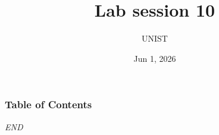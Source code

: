 \documentclass[aspectratio=169,10pt]{beamer}
\title[Introduction to AIP2] %
{Lab session 10}
\author{UNIST}
\institute[UNIST] %
{
  Ulsan National Institute of Science and Technology
}
\date %
{Jun 1, 2026}
\begin{document}
\frame{\titlepage}


\begin{frame}
\frametitle{Table of Contents}
\tableofcontents
\end{frame}









\begin{frame}{}
    \centering \Large
    \emph{END}
\end{frame}
  
\end{document}
